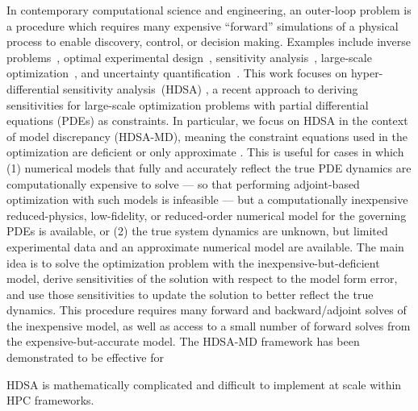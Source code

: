 In contemporary computational science and engineering, an outer-loop problem is a procedure which requires many expensive ``forward'' simulations of a physical process to enable discovery, control, or decision making.
Examples include inverse problems~\cite{ghattas2021learning,stuart2010bayesianinverse}, optimal experimental design~\cite{alexanderian2021oed,aretz2024greedysensorselection,attia2018oed}, sensitivity analysis~\cite{brandes2007stabilityanalysis,buskens2006parametricsensitivity}, large-scale optimization~\cite{akcelik2006parallelpdecon,biegler2007pdeconstrainedopt,zahr2015progressive}, and uncertainty quantification~\cite{oden2004verification,biehler2014efficientuq,na2012reliability,smith2013uqbook}.
This work focuses on hyper-differential sensitivity analysis~(HDSA) \cite{hart2023hdsaillposed,hart2023hdsaoptimal,hart2025hdsaposterior,hart2020hdsapde,hart2025hdsaprior,stevens2022hdsaodes,sunseri2024hdsabayesian,sunseri2020hdsainverse}, a recent approach to deriving sensitivities for large-scale optimization problems with partial differential equations (PDEs) as constraints.
In particular, we focus on HDSA in the context of model discrepancy (HDSA-MD), meaning the constraint equations used in the optimization are deficient or only approximate \cite{hart2023hdsaoptimal,hart2025hdsaposterior}.
This is useful for cases in which (1) numerical models that fully and accurately reflect the true PDE dynamics are computationally expensive to solve --- so that performing adjoint-based optimization with such models is infeasible --- but a computationally inexpensive reduced-physics, low-fidelity, or reduced-order numerical model for the governing PDEs is available, or (2) the true system dynamics are unknown, but limited experimental data and an approximate numerical model are available.
The main idea is to solve the optimization problem with the inexpensive-but-deficient model, derive sensitivities of the solution with respect to the model form error, and use those sensitivities to update the solution to better reflect the true dynamics.
This procedure requires many forward and backward/adjoint solves of the inexpensive model, as well as access to a small number of forward solves from the expensive-but-accurate model.
The HDSA-MD framework has been demonstrated to be effective for 

\begin{purpose}
HDSA is mathematically complicated and difficult to implement at scale within HPC frameworks.
\end{purpose}

